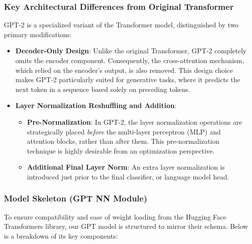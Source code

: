 \subsubsection{Key Architectural Differences from Original Transformer}
GPT-2 is a specialized variant of the Transformer model, distinguished by two primary modifications:
\begin{itemize}
    \item \textbf{Decoder-Only Design}: Unlike the original Transformer, GPT-2 completely omits the encoder component. Consequently, the cross-attention mechanism, which relied on the encoder's output, is also removed. This design choice makes GPT-2 particularly suited for generative tasks, where it predicts the next token in a sequence based solely on preceding tokens.
    \item \textbf{Layer Normalization Reshuffling and Addition}:
    \begin{itemize}
        \item \textbf{Pre-Normalization}: In GPT-2, the layer normalization operations are strategically placed \textit{before} the multi-layer perceptron (MLP) and attention blocks, rather than after them. This pre-normalization technique is highly desirable from an optimization perspective.
        \item \textbf{Additional Final Layer Norm}: An extra layer normalization is introduced just prior to the final classifier, or language model head.
    \end{itemize}
\end{itemize}

\subsubsection{Model Skeleton (GPT NN Module)}
To ensure compatibility and ease of weight loading from the Hugging Face Transformers library, our GPT model is structured to mirror their schema. Below is a breakdown of its key components:

